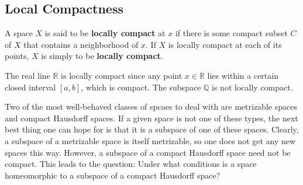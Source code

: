 \documentclass{article}
\begin{document}
  \subsection{Local Compactness}

    \begin{definition}
    A space $X$ is said to be \textbf{locally compact} at $x$ if there is some compact subset $C$ of $X$ that contains a neighborhood of $x$. If $X$ is locally compact at each of its points, $X$ is simply to be \textbf{locally compact}. 
    \end{definition}

    \begin{example}
    The real line $\mathbb{R}$ is locally compact since any point $x \in \mathbb{R}$ lies within a certain closed interval $[a,b]$, which is compact. The subspace $\mathbb{Q}$ is not locally compact. 
    \end{example}

    Two of the most well-behaved classes of spcaes to deal with are metrizable spaces and compact Hausdorff spaces. If a given space is not one of these types, the next best thing one can hope for is that it is a subspace of one of these spaces. Clearly, a subspace of a metrizable space is itself metrizable, so one does not get any new spaces this way. However, a subspace of a compact Hausdorff space need not be compact. This leads to the question: Under what conditions is a space homeomorphic to a subspace of a compact Hausdorff space? 
\end{document}

